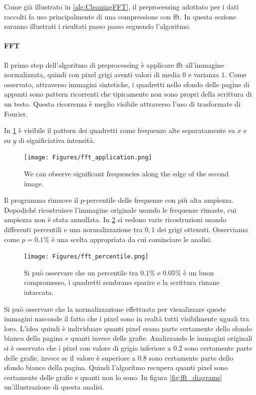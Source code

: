 \begin{toDo}
    \noindent Come già illustrato in \cref{alg:CleaningFFT}, il preprocessing adottato per i dati raccolti fa uso principalmente di una compressione con \gls{fft}. In questa sezione saranno illustrati i risultati passo passo seguendo l'algoritmo.

    \paragraph{FFT}
    Il primo step dell'algoritmo di preprocessing è applicare \gls{fft} all'immagine normalizzata, quindi con pixel grigi aventi valori di media $0$ e varianza $1$. Come osservato, attraverso immagini sintetiche, i quadretti nello sfondo delle pagine di appunti sono pattern ricorrenti che tipicamente non sono propri della scrittura di un testo. Questa ricorrenza è meglio visibile attraverso l'uso di trasformate di Fourier.

   	\noindent In \cref{fig:fft_application} è visibile il pattern dei quadretti come frequenze alte separatamente su $x$ e su $y$ di significiativa intensità.

    \begin{figure}[H]
    	\centering
    	\texttt{[image: Figures/fft\_application.png]}
    	\caption[fft application]{We can observe significant frequencies along the edge of the second image.}
    	\label{fig:fft_application}
    \end{figure}

	\noindent Il programma rimuove il $p$-percentile delle frequenze con più alta ampiezza. Dopodiché ricostruisce l'immagine originale usando le frequenze rimaste, cui ampiezza non è stata annullata. In \cref{fig:fft_percentile} si vedono varie ricostruzioni usando differenti percentili e una normalizzazione tra $0,1$ dei grigi ottenuti. Osserviamo come $p=0.1\%$ è una scelta appropriata da cui cominciare le analisi.

	\begin{figure}[H]
		\centering
		\texttt{[image: Figures/fft\_percentile.png]}
		\caption[comparing different percentiles in fft]{Si può osservare che un percentile tra $0.1\%$ e $0.05\%$ è un buon compromesso, i quadretti sembrano sparire e la scrittura rimane intaccata.}
		\label{fig:fft_percentile}
	\end{figure}

	\noindent Si può osservare che la normalizzazione effettuata per visualizzare queste immagini nasconde il fatto che i pixel sono in realtà tutti visibilmente uguali tra loro. L'idea quindi è individuare quanti pixel erano parte certamente dello sfondo bianco della pagina e quanti invece delle grafie. Analizzando le immagini originali si è osservato che i pixel con valore di grigio inferiore a $0.2$ sono certamente parte delle grafie, invece se il valore è superiore a $0.8$ sono certamente parte dello sfondo bianco della pagina. Quindi l'algoritmo recupera quanti pixel sono certamente delle grafie e quanti non lo sono. In figura \cref{fig:fft_diagrams} un'illustrazione di questa analisi.


\end{toDo}
